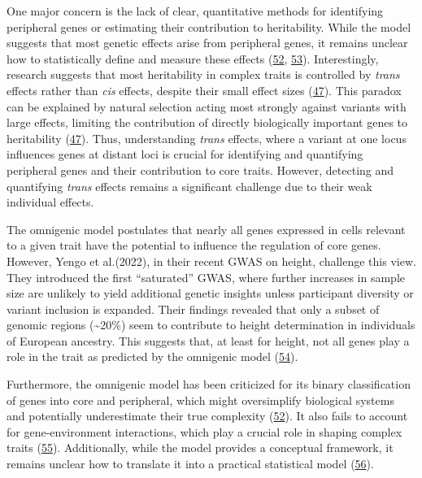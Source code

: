 One major concern is the lack of clear, quantitative methods for identifying peripheral genes or estimating their contribution to heritability.
While the model suggests that most genetic effects arise from peripheral genes, it remains unclear how to statistically define and measure these effects (\protect\hyperlink{ref-82fs3SZo}{52}, \protect\hyperlink{ref-javtAG7r}{53}).
Interestingly, research suggests that most heritability in complex traits is controlled by \emph{trans} effects rather than \emph{cis} effects, despite their small effect sizes (\protect\hyperlink{ref-LXvTZzEA}{47}).
This paradox can be explained by natural selection acting most strongly against variants with large effects, limiting the contribution of directly biologically important genes to heritability (\protect\hyperlink{ref-LXvTZzEA}{47}).
Thus, understanding \emph{trans} effects, where a variant at one locus influences genes at distant loci is crucial for identifying and quantifying peripheral genes and their contribution to core traits.
However, detecting and quantifying \emph{trans} effects remains a significant challenge due to their weak individual effects.

The omnigenic model postulates that nearly all genes expressed in cells relevant to a given trait have the potential to influence the regulation of core genes.
However, Yengo et al.(2022), in their recent GWAS on height, challenge this view.
They introduced the first ``saturated'' GWAS, where further increases in sample size are unlikely to yield additional genetic insights unless participant diversity or variant inclusion is expanded.
Their findings revealed that only a subset of genomic regions (\textasciitilde20\%) seem to contribute to height determination in individuals of European ancestry.
This suggests that, at least for height, not all genes play a role in the trait as predicted by the omnigenic model (\protect\hyperlink{ref-HFRaLwGQ}{54}).

Furthermore, the omnigenic model has been criticized for its binary classification of genes into core and peripheral, which might oversimplify biological systems and potentially underestimate their true complexity (\protect\hyperlink{ref-82fs3SZo}{52}).
It also fails to account for gene-environment interactions, which play a crucial role in shaping complex traits (\protect\hyperlink{ref-dg9nKuy0}{55}).
Additionally, while the model provides a conceptual framework, it remains unclear how to translate it into a practical statistical model (\protect\hyperlink{ref-1GlQtJ9Yz}{56}).

